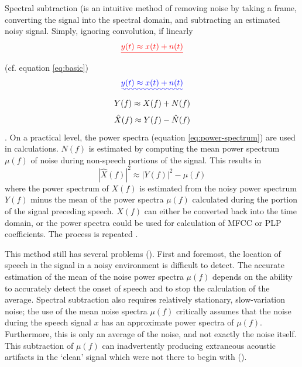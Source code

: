 Spectral subtraction (\cite{boll:79}\DIFaddbegin \DIFadd{) }\DIFaddend is an intuitive method of removing noise by taking a frame, converting the signal into the spectral domain, and subtracting an estimated noisy signal. Simply, ignoring convolution, if linearly \DIFdelbegin \begin{displaymath}\DIFdel{ y(t) \approx x(t) + n(t) }\end{displaymath} %
\DIFdelend (cf. equation \ref{eq:basic}) \DIFdelbegin {}\DIFdelend \DIFaddbegin \begin{equation}\DIFadd{ y(t) \approx x(t) + n(t) }\end{equation} \DIFaddend \begin{equation} Y(f) \approx X(f) + N(f)  \end{equation}%
\DIFdelend \DIFaddbegin \DIFadd{, } \DIFaddend \begin{equation} \hat{X}(f) \approx Y(f) - \hat{N}(f)  \end{equation}%
\DIFdelend . \DIFaddbegin   \DIFaddend On a practical level, the power spectra (equation \ref{eq:power-spectrum}) are used in calculations.  $N(f)$ is estimated by computing the mean power spectrum $\mu(f)$ of noise during non-speech portions of the signal.  This results in \begin{equation} |\hat{X}(f)|^2 \approx |Y(f)|^2 - \mu(f) \end{equation} where the power spectrum of $X(f)$ is estimated from the noisy power spectrum $Y(f)$ minus the mean of the power spectra $\mu(f)$ calculated during the portion of the signal preceding speech. $X(f)$ can either be converted back into the time domain, or the power spectra could be used for calculation of MFCC or PLP coefficients.  The process is repeated \DIFdelbegin {}\DIFdelend \DIFaddbegin {}\DIFaddend .

This method still has several problems (\cite{li:14}). First and foremost, the location of speech in the signal in a noisy environment is difficult to detect.  The accurate estimation of the mean of the noise power spectra $\mu(f)$ depends on the ability to accurately detect the onset of speech and to stop the calculation of the average.  Spectral subtraction also requires relatively stationary, slow-variation noise; the use of the mean noise spectra $\mu(f)$ critically assumes that the noise during the speech signal $x$ has an approximate power spectra of $\mu(f)$.  Furthermore, this is only an average of the noise, and not exactly the noise itself.  This subtraction of $\mu(f)$ can inadvertently \DIFdelbegin {}\DIFdelend producing extraneous acoustic artifacts in the `clean' signal which were not there to begin with (\cite{berouti:79}).

